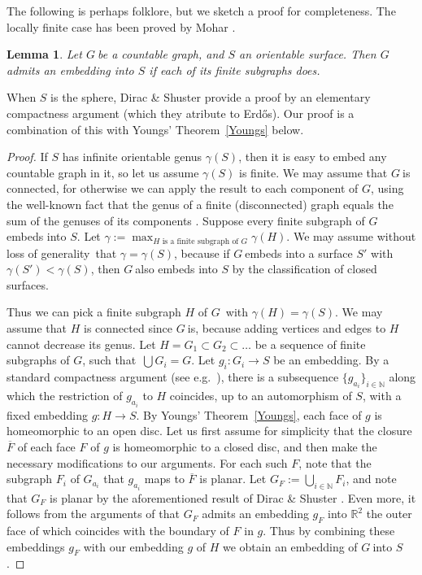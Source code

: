 \documentclass{article}
\newtheorem{lemma}[proposition]{Lemma}
\newcommand{\N}{\ensuremath{\mathbb N}}
\newcommand{\R}{\ensuremath{\mathbb R}}
\newcommand{\cls}[1]{\ensuremath{\overline{#1}}}
\newcommand{\g}{\ensuremath{G\ }}
\newcommand{\G}{\ensuremath{G}}
\newcommand{\Tr}[1]{Theorem~\ref{#1}}
\newcommand{\st}{such that}
\newcommand{\obda}{without loss of generality}
\newcommand{\Erd}{Erd\H{o}s}
\begin{document}
The following is perhaps folklore, but we sketch a proof for completeness. The locally finite case has been proved by Mohar \cite[\S 5]{mohar88}. 
\begin{lemma} \label{lem emb cof}
Let \g be a  countable graph, and $S$ an orientable  surface. Then \g admits an embedding into $S$ if each of its finite subgraphs does.
\end{lemma}

When $S$ is the sphere, Dirac \& Shuster \cite{DiracSchuster} provide a proof  by an elementary compactness argument (which they atribute to \Erd).
Our proof is a combination of this with Youngs' \Tr{Youngs} below.

\begin{proof}
If $S$ has infinite orientable genus $\gamma(S)$, then it is easy to embed any  countable graph in it, so let us assume $\gamma(S)$ is finite. We may assume that \g is connected, for otherwise we can apply the result to each component of \G, using the well-known fact that the genus of a finite (disconnected) graph equals the sum of the genuses of its components \cite[Corollary 2]{BHKY}.
Suppose every finite subgraph of \g embeds into $S$. Let $\gamma:= \max_{H  \text{ is a finite subgraph of } G} \gamma(H)$. We may assume \obda\ that  $\gamma= \gamma(S)$, because if \g embeds into a surface $S'$ with $\gamma(S')< \gamma(S)$, then \g also embeds into $S$ by the classification of closed surfaces.

Thus we can pick a finite subgraph $H$ of  \G\ with $\gamma(H) = \gamma(S)$. We may assume that $H$ is connected since \g is, because adding vertices and edges to $H$ cannot decrease its genus. Let $H= G_1 \subset G_2 \subset \ldots$ be a sequence of finite subgraphs of \G, \st\ $\bigcup G_i = G$. Let $g_i: G_i \to S$ be an embedding. By a standard compactness argument (see e.g.\ \cite[\S 5]{mohar88}), there is a subsequence $\{g_{a_i}\}_{i\in \N}$ along which the restriction of $g_{a_i}$ to $H$ coincides, up to an automorphism of $S$, with a fixed embedding $g: H \to S$. By Youngs' \Tr{Youngs}, each face of $g$ is homeomorphic to an open disc. Let us first assume for simplicity that the closure $\cls{F}$ of each face $F$ of $g$ is homeomorphic to a closed disc, and then make the necessary modifications to our arguments. For each such $F$, note that the subgraph $F_i$ of $G_{a_i}$ that $g_{a_i}$ maps to $\cls{F}$ is planar. Let $G_F:= \bigcup_{i\in \N} F_i$, and note that $G_F$ is planar by the aforementioned result of Dirac \& Shuster \cite{DiracSchuster}. Even more, it follows from the arguments of \cite{DiracSchuster} that $G_F$ admits an embedding $g_F$ into $\R^2$ the outer face of which coincides with the boundary of $F$ in $g$. Thus by combining these embeddings $g_F$ with our embedding $g$ of $H$ we obtain an embedding of \g into $S$.


\end{proof}
\end{document}
